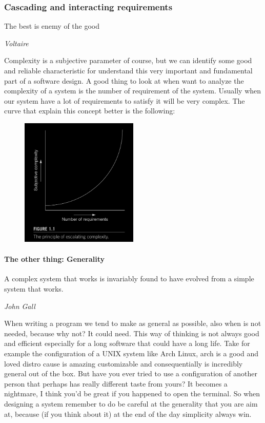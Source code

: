 \documentclass{article}
\begin{document}
    \subsubsection{Cascading and interacting requirements}
      \epigraph{The best is enemy of the good}{\textit{Voltaire}}
      Complexity is a subjective parameter of course, but we can identify some good and reliable characteristic for 
      understand this very important and fundamental part of a software design. A good thing to look at when want to 
      analyze the complexity of a system is the number of requirement of the system. Usually when our system have a 
      lot of requirements to satisfy it will be very complex. The curve that explain this concept better is the following: 
      \begin{figure}[h]
        \centering
        \includegraphics[width=0.50\textwidth]{requirements-graph}
        \caption{}
        \label{fig:mesh1}
      \end{figure}
      \paragraph{The other thing: Generality}
        \epigraph{A complex system that works is invariably found to have evolved from a simple system 
          that works.}{\textit{John Gall}}
        When writing a program we tend to make as general as possible, also when is not needed, because why not? It could need.
        This way of thinking is not always good and efficient especially for a long software that could have a long life. Take for
        example the configuration of a UNIX system like Arch Linux, arch is a good and loved distro cause is amazing customizable and 
        consequentially is incredibly general out of the box. But have you ever tried to use a configuration of another person that perhaps
        has really different taste from yours? It becomes a nightmare, I think you'd be great if you happened to open the terminal. So 
        when designing a system remember to do be careful at the generality that you are aim at, because (if you think about it) at 
        the end of the day simplicity always win. 
\end{document}
